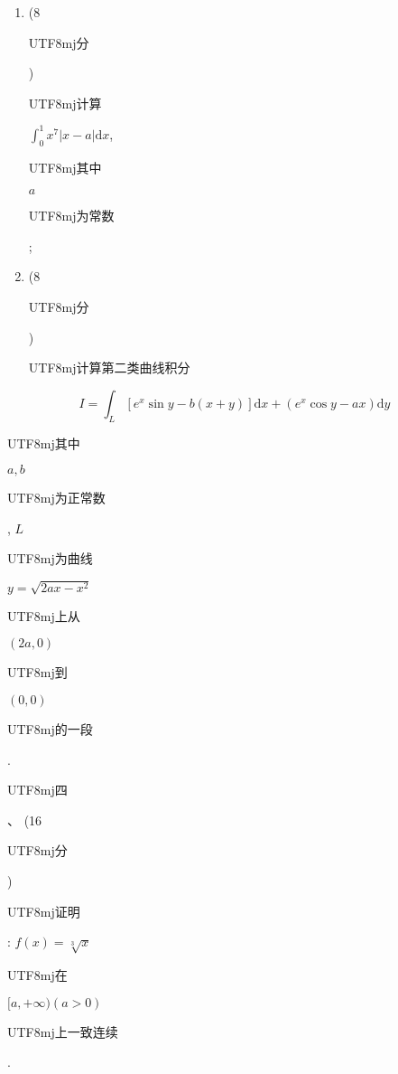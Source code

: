 \documentclass[10pt]{article}
\begin{document}
\begin{enumerate}
  \item (8 \begin{CJK}{UTF8}{mj}分\end{CJK}) \begin{CJK}{UTF8}{mj}计算\end{CJK} $\int_{0}^{1} x^{7}|x-a| \mathrm{d} x$, \begin{CJK}{UTF8}{mj}其中\end{CJK} $a$ \begin{CJK}{UTF8}{mj}为常数\end{CJK};

  \item (8 \begin{CJK}{UTF8}{mj}分\end{CJK}) \begin{CJK}{UTF8}{mj}计算第二类曲线积分\end{CJK}

\end{enumerate}
$$
I=\int_{L}\left[e^{x} \sin y-b(x+y)\right] \mathrm{d} x+\left(e^{x} \cos y-a x\right) \mathrm{d} y
$$
\begin{CJK}{UTF8}{mj}其中\end{CJK} $a, b$ \begin{CJK}{UTF8}{mj}为正常数\end{CJK}, $L$ \begin{CJK}{UTF8}{mj}为曲线\end{CJK} $y=\sqrt{2 a x-x^{2}}$ \begin{CJK}{UTF8}{mj}上从\end{CJK} $(2 a, 0)$ \begin{CJK}{UTF8}{mj}到\end{CJK} $(0,0)$ \begin{CJK}{UTF8}{mj}的一段\end{CJK}.

\begin{CJK}{UTF8}{mj}四\end{CJK}、 (16 \begin{CJK}{UTF8}{mj}分\end{CJK}) \begin{CJK}{UTF8}{mj}证明\end{CJK}: $f(x)=\sqrt[3]{x}$ \begin{CJK}{UTF8}{mj}在\end{CJK} $[a,+\infty)(a>0)$ \begin{CJK}{UTF8}{mj}上一致连续\end{CJK}.
\end{document}
